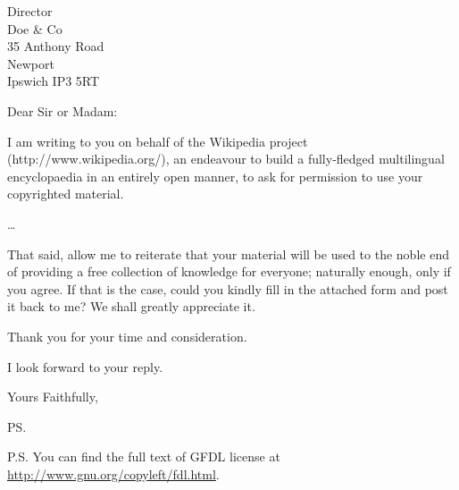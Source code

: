 \documentclass{extletter}
\begin{document}
\begin{letter}{Director \\ Doe \& Co \\ 35 Anthony Road
\\ Newport \\ Ipswich IP3 5RT}
\opening{Dear Sir or Madam:}

I am writing to you on behalf of the Wikipedia project (http://www.wikipedia.org/),
an endeavour to build a fully-fledged multilingual encyclopaedia in an entirely
open manner, to ask for permission to use your copyrighted material.

\ldots 

That said, allow me to reiterate that your material will be used to the noble end of
providing a free collection of knowledge for everyone; naturally enough, only if you
agree. If that is the case, could you kindly fill in the attached form and post it
back to me? We shall greatly appreciate it.

Thank you for your time and consideration.

I look forward to your reply.

\closing{Yours Faithfully,}

\ps

P.S. You can find the full text of GFDL license at
\url{http://www.gnu.org/copyleft/fdl.html}.


\end{letter}
\end{document}
